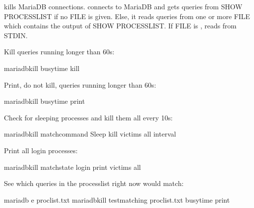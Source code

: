 \documentclass[letterpaper,10pt,english]{sphinxmanual}
\begin{document}
\sphinxAtStartPar
{} kills MariaDB connections.   connects to MariaDB and gets queries
from SHOW PROCESSLIST if no FILE is given.  Else, it reads queries from one
or more FILE which contains the output of SHOW PROCESSLIST.  If FILE is \sphinxhyphen{},
 reads from STDIN.

\sphinxAtStartPar
Kill queries running longer than 60s:

\begin{sphinxVerbatim}[commandchars=\\\{\}]
mariadb\PYGZhy{}kill \PYGZhy{}\PYGZhy{}busy\PYGZhy{}time  \PYGZhy{}\PYGZhy{}kill
\end{sphinxVerbatim}

\sphinxAtStartPar
Print, do not kill, queries running longer than 60s:

\begin{sphinxVerbatim}[commandchars=\\\{\}]
mariadb\PYGZhy{}kill \PYGZhy{}\PYGZhy{}busy\PYGZhy{}time  \PYGZhy{}\PYGZhy{}print
\end{sphinxVerbatim}

\sphinxAtStartPar
Check for sleeping processes and kill them all every 10s:

\begin{sphinxVerbatim}[commandchars=\\\{\}]
mariadb\PYGZhy{}kill \PYGZhy{}\PYGZhy{}match\PYGZhy{}command Sleep \PYGZhy{}\PYGZhy{}kill \PYGZhy{}\PYGZhy{}victims all \PYGZhy{}\PYGZhy{}interval 
\end{sphinxVerbatim}

\sphinxAtStartPar
Print all login processes:

\begin{sphinxVerbatim}[commandchars=\\\{\}]
mariadb\PYGZhy{}kill \PYGZhy{}\PYGZhy{}match\PYGZhy{}state login \PYGZhy{}\PYGZhy{}print \PYGZhy{}\PYGZhy{}victims all
\end{sphinxVerbatim}

\sphinxAtStartPar
See which queries in the processlist right now would match:

\begin{sphinxVerbatim}[commandchars=\\\{\}]
mariadb \PYGZhy{}e  \PYGZgt{} proclist.txt
mariadb\PYGZhy{}kill \PYGZhy{}\PYGZhy{}test\PYGZhy{}matching proclist.txt \PYGZhy{}\PYGZhy{}busy\PYGZhy{}time  \PYGZhy{}\PYGZhy{}print
\end{sphinxVerbatim}
\end{document}
